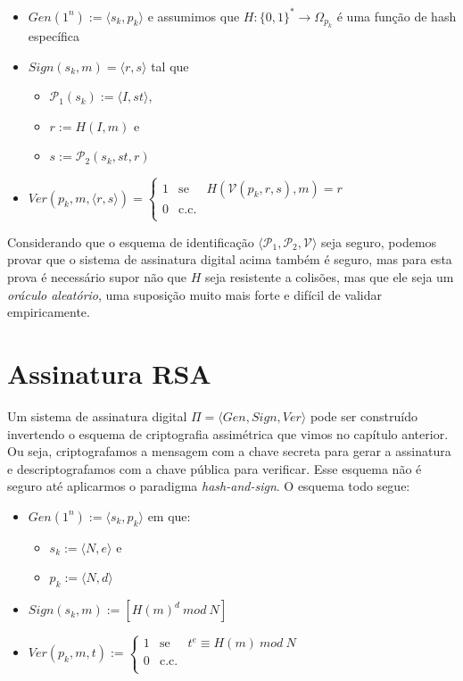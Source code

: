 \begin{itemize}
\item $Gen(1^n) := \langle s_k, p_k \rangle$ e assumimos que $H: \{0,1\}^* \to \Omega_{p_k}$ é uma função de hash específica
\item $Sign(s_k, m) = \langle r, s \rangle$ tal que
\begin{itemize}
\item $\mathcal{P}_1(s_k) := \langle I, st \rangle$,
\item $r := H(I, m)$ e
\item $s := \mathcal{P}_2(s_k, st, r)$
\end{itemize}
\item $Ver(p_k, m, \langle r, s \rangle) = \left\{
    \begin{array}{lcl}
      1 & \textrm{se} & H(\mathcal{V}(p_k, r, s), m) = r\\
      0 & \textrm{c.c.} &\\
    \end{array}
    \right.$
\end{itemize}

Considerando que o esquema de identificação $\langle \mathcal{P}_1, \mathcal{P}_2, \mathcal{V} \rangle$ seja seguro, podemos provar que o sistema de assinatura digital acima também é seguro, mas para esta prova é necessário supor não que $H$ seja resistente a colisões, mas que ele seja um {\em oráculo aleatório}, uma suposição muito mais forte e difícil de validar empiricamente.


\section{Assinatura RSA}
\label{sec:assinatura-rsa}

Um sistema de assinatura digital $\Pi = \langle Gen, Sign, Ver \rangle$ pode ser construído invertendo o esquema de criptografia assimétrica que vimos no capítulo anterior.
Ou seja, criptografamos a mensagem com a chave secreta para gerar a assinatura e descriptografamos com a chave pública para verificar.
Esse esquema não é seguro até aplicarmos o paradigma {\em hash-and-sign}.
O esquema todo segue:
\begin{itemize}
\item $Gen(1^n) := \langle s_k, p_k \rangle$ em que:
\begin{itemize}
\item $s_k := \langle N, e \rangle$ e
\item $p_k := \langle N, d \rangle$
\end{itemize}
\item $Sign(s_k, m) := [H(m)^d\ mod\ N]$
\item $Ver(p_k, m, t) := \left\{
    \begin{array}{lcl}
      1 & \textrm{se} & t^e \equiv H(m)\ mod\ N\\
      0 & \textrm{c.c.} &\\
    \end{array}
    \right.$
\end{itemize}

